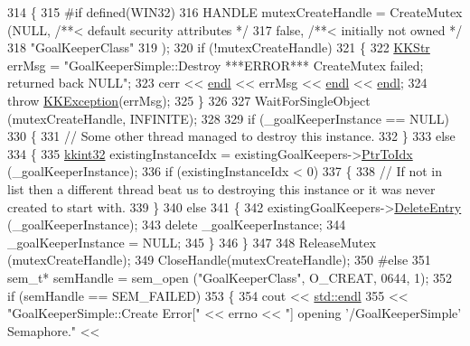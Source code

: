 \begin{DoxyCode}
314 \{
315 \textcolor{preprocessor}{#if  defined(WIN32)}
316   HANDLE  mutexCreateHandle = CreateMutex (NULL,                 \textcolor{comment}{/**< default security attributes */}
317                                            \textcolor{keyword}{false},                \textcolor{comment}{/**< initially not owned */}
318                                            \textcolor{stringliteral}{"GoalKeeperClass"}
319                                           ); 
320   \textcolor{keywordflow}{if} (!mutexCreateHandle)
321   \{
322     \hyperlink{class_k_k_b_1_1_k_k_str}{KKStr} errMsg = \textcolor{stringliteral}{"GoalKeeperSimple::Destroy   ***ERROR***   CreateMutex failed; returned back NULL"};
323     cerr << \hyperlink{namespace_k_k_b_ad1f50f65af6adc8fa9e6f62d007818a8}{endl} << errMsg << \hyperlink{namespace_k_k_b_ad1f50f65af6adc8fa9e6f62d007818a8}{endl} << \hyperlink{namespace_k_k_b_ad1f50f65af6adc8fa9e6f62d007818a8}{endl};
324     \textcolor{keywordflow}{throw} \hyperlink{class_k_k_b_1_1_k_k_exception}{KKException}(errMsg);
325   \}
326 
327   WaitForSingleObject (mutexCreateHandle, INFINITE);
328 
329   \textcolor{keywordflow}{if}  (\_goalKeeperInstance == NULL)
330   \{
331     \textcolor{comment}{// Some other thread managed to destroy this instance.}
332   \}
333   \textcolor{keywordflow}{else}
334   \{
335     \hyperlink{namespace_k_k_b_a8fa4952cc84fda1de4bec1fbdd8d5b1b}{kkint32}  existingInstanceIdx =  existingGoalKeepers->\hyperlink{class_k_k_b_1_1_k_k_queue_ac7c26abdf599669a4b0898534f735f99}{PtrToIdx} (\_goalKeeperInstance);
336     \textcolor{keywordflow}{if}  (existingInstanceIdx < 0)
337     \{
338       \textcolor{comment}{// If not in list then a  different thread beat us to destroying this instance or it was never
       created to start with.}
339     \}
340     \textcolor{keywordflow}{else}
341     \{
342       existingGoalKeepers->\hyperlink{class_k_k_b_1_1_k_k_queue_ae362e3b0a128e8a09182e167befda088}{DeleteEntry} (\_goalKeeperInstance);
343       \textcolor{keyword}{delete}  \_goalKeeperInstance;
344       \_goalKeeperInstance = NULL;
345     \}
346   \}
347 
348   ReleaseMutex (mutexCreateHandle);
349   CloseHandle(mutexCreateHandle);
350 \textcolor{preprocessor}{#else}
351   sem\_t*  semHandle = sem\_open (\textcolor{stringliteral}{"GoalKeeperClass"}, O\_CREAT, 0644, 1);
352   \textcolor{keywordflow}{if}  (semHandle == SEM\_FAILED)
353   \{
354     cout << \hyperlink{namespace_k_k_b_ad1f50f65af6adc8fa9e6f62d007818a8}{std::endl}
355          << \textcolor{stringliteral}{"GoalKeeperSimple::Create  Error["} << errno << \textcolor{stringliteral}{"] opening '/GoalKeeperSimple' Semaphore."} << 

\end{DoxyCode}
